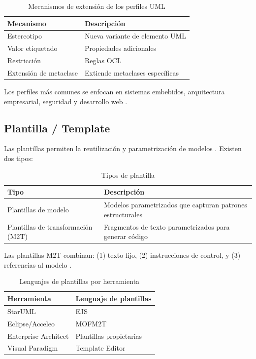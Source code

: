 \documentclass[journal,onecolumn]{IEEEtran}
\begin{document}
\begin{table}[H]
	\centering
	\caption{Mecanismos de extensión de los perfiles UML}
	\label{tab:perfiles-mecanismos}
	\begin{tabular}{|l|p{8cm}|}
		\hline
		\textbf{Mecanismo} & \textbf{Descripción} \\
		\hline
		Estereotipo & Nueva variante de elemento UML \\
		\hline
		Valor etiquetado & Propiedades adicionales \\
		\hline
		Restricción & Reglas OCL \\
		\hline
		Extensión de metaclase & Extiende metaclases específicas \\
		\hline
	\end{tabular}
\end{table}

Los perfiles más comunes se enfocan en sistemas embebidos, arquitectura empresarial, seguridad y desarrollo web \cite{Zafar2024}.

\subsection{Plantilla / Template}

Las plantillas permiten la reutilización y parametrización de modelos \cite{Vanwormhoudt2020}. Existen dos tipos:

\begin{table}[H]
	\centering
	\caption{Tipos de plantilla}
	\label{tab:plantilla-tipos}
	\begin{tabular}{|l|p{8cm}|}
		\hline
		\textbf{Tipo} & \textbf{Descripción} \\
		\hline
		Plantillas de modelo & Modelos parametrizados que capturan patrones estructurales \\
		\hline
		Plantillas de transformación (M2T) & Fragmentos de texto parametrizados para generar código \\
		\hline
	\end{tabular}
\end{table}

Las plantillas M2T combinan: (1) texto fijo, (2) instrucciones de control, y (3) referencias al modelo \cite{He2024}.

\begin{table}[H]
	\centering
	\caption{Lenguajes de plantillas por herramienta}
	\label{tab:plantillas-herramientas}
	\begin{tabular}{|l|l|}
		\hline
		\textbf{Herramienta} & \textbf{Lenguaje de plantillas} \\
		\hline
		StarUML & EJS \\
		\hline
		Eclipse/Acceleo & MOFM2T \\
		\hline
		Enterprise Architect & Plantillas propietarias \\
		\hline
		Visual Paradigm & Template Editor \\
		\hline
	\end{tabular}
\end{table}
\end{document}
